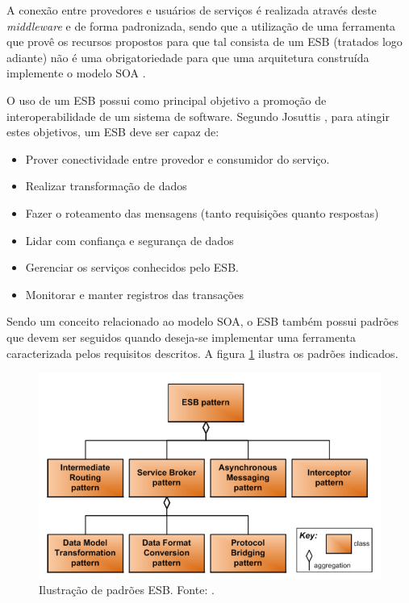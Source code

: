 A conexão entre provedores e usuários de serviços é realizada através deste \textit{middleware} e de forma padronizada, sendo que a utilização de uma ferramenta que provê os recursos propostos para que tal consista de um ESB (tratados logo adiante) não é uma obrigatoriedade para que uma arquitetura construída implemente o modelo SOA \cite{lewis_getting_2010}.

O uso de um ESB possui como principal objetivo a promoção de interoperabilidade de um sistema de software. Segundo Josuttis \cite{josuttis_soa_2007}, para atingir estes objetivos, um ESB deve ser capaz de:

\begin{itemize}
\item Prover conectividade entre provedor e consumidor do serviço.
\item Realizar transformação de dados
\item Fazer o roteamento das mensagens (tanto requisições quanto respostas)
\item Lidar com confiança e segurança de dados
\item Gerenciar os serviços conhecidos pelo ESB.
\item Monitorar e manter registros das transações
\end{itemize}

Sendo um conceito relacionado ao modelo SOA, o ESB também possui padrões que devem ser seguidos quando deseja-se implementar uma ferramenta caracterizada pelos requisitos descritos. A figura \ref{padrao_ESB} ilustra os padrões indicados.

\begin{figure}[htb]
\centering
\includegraphics[scale=0.5]{figuras/padrao_ESB.png}
\caption{Ilustração de padrões ESB. Fonte: \cite{bianco_architecting_2011}.}
\label{padrao_ESB}
\end{figure}

